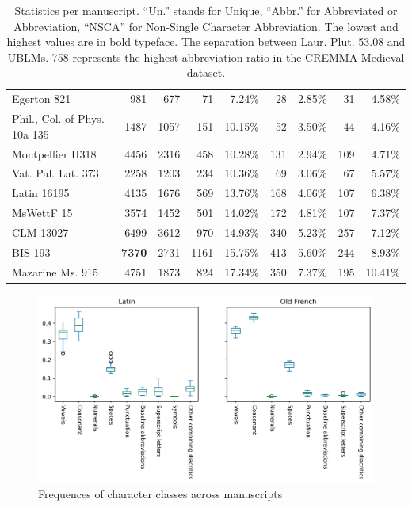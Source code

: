 \documentclass{article}
\begin{document}
\begin{table}[]
{\begin{tabular}{lrrrrrrrr}
Egerton 821                  &    981 &           677 &                 71 &        7.24\% &          28 &       2.85\% &            31 &               4.58\% \\
Phil., Col. of Phys. 10a 135 &   1487 &          1057 &                151 &       10.15\% &          52 &       3.50\% &            44 &               4.16\% \\
Montpellier H318             &   4456 &          2316 &                458 &       10.28\% &         131 &       2.94\% &           109 &               4.71\% \\
Vat. Pal. Lat. 373           &   2258 &          1203 &                234 &       10.36\% &          69 &       3.06\% &            67 &               5.57\% \\
Latin 16195                  &   4135 &          1676 &                569 &       13.76\% &         168 &       4.06\% &           107 &               6.38\% \\
MsWettF 15                   &   3574 &          1452 &                501 &       14.02\% &         172 &       4.81\% &           107 &               7.37\% \\
CLM 13027                    &   6499 &          3612 &                970 &       14.93\% &         340 &       5.23\% &           257 &               7.12\% \\
BIS 193                      &   \textbf{7370} &          2731 &               1161 &       15.75\% &         413 &       5.60\% &           244 &               8.93\% \\
Mazarine Ms. 915             &   4751 &          1873 &                824 &       17.34\% &         350 &       7.37\% &           195 &              10.41\% \\
\hline
\end{tabular}
%
}
    \caption{Statistics per manuscript. \enquote{Un.} stands for Unique, \enquote{Abbr.} for Abbreviated or Abbreviation, \enquote{NSCA} for Non-Single Character Abbreviation. The lowest and highest values are in bold typeface. The separation between Laur. Plut. 53.08 and UBLMs. 758 represents the highest abbreviation ratio in the CREMMA Medieval dataset.}
    \label{tab:mss_words}
\end{table}



\begin{figure}
    \centering
    \includegraphics[width=.8\linewidth]{datapaper/images/figures/type_freq.png}
    \caption{Frequences of character classes across manuscripts}
    \label{fig:char_freqs_mss}
\end{figure}
\end{document}
